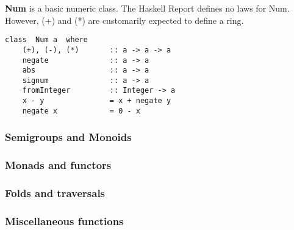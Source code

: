 \textbf{Num} is a basic numeric class.
The Haskell Report defines no laws for Num.
However, (+) and (*) are customarily expected to define a ring.
\begin{verbatim}
class  Num a  where
    (+), (-), (*)       :: a -> a -> a
    negate              :: a -> a
    abs                 :: a -> a
    signum              :: a -> a
    fromInteger         :: Integer -> a
    x - y               = x + negate y
    negate x            = 0 - x
\end{verbatim}








\subsubsection{Semigroups and Monoids}

\subsubsection{Monads and functors}

\subsubsection{Folds and traversals}

\subsubsection{Miscellaneous functions}

%